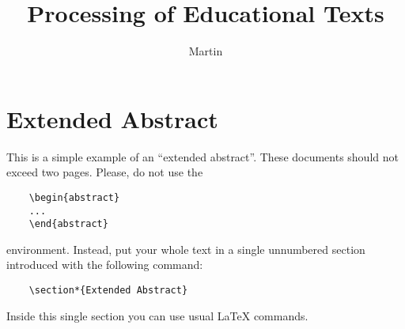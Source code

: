 \documentclass{iitsrc}
\title{Processing of Educational Texts}
\author{Martin}{Nemček}
\begin{document}
\section*{Extended Abstract}

This is a simple example of an ``extended abstract''. These documents should not exceed two pages. Please, do not use the
\begin{verbatim}
    \begin{abstract}
    ...
    \end{abstract}
\end{verbatim}
environment. Instead, put your whole text in a single unnumbered section introduced with the following command:
\begin{verbatim}
    \section*{Extended Abstract}
\end{verbatim}
Inside this single section you can use usual \LaTeX{} commands.

\nocite{lamport:latex}




\end{document}
